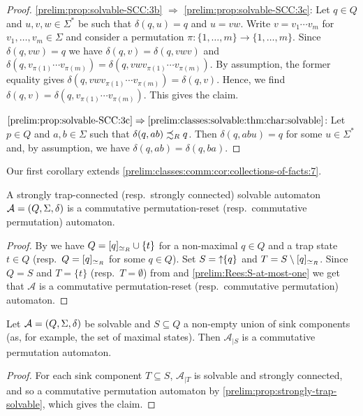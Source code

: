 \begin{proof}
\ref{prelim:prop:solvable-SCC:3b} $\Rightarrow$ \ref{prelim:prop:solvable-SCC:3c}: Let $q \in Q$ and $u,v,w \in \Sigma^*$
be such that $\delta(q, u) = q$ and $u = vw$. Write $v = v_1 \cdots v_m$
for $v_1, \ldots, v_m \in \Sigma$ and 
consider a permutation $\pi \colon \{1,\ldots, m\} \to \{1,\ldots,m\}$.
Since $\delta(q, vw) = q$ we have $ \delta(q, v) = \delta(q, vwv)$
and $\delta(q, v_{\pi(1)} \cdots v_{\pi(m)})
= \delta(q, vwv_{\pi(1)} \cdots v_{\pi(m)})$.	
By assumption, the former equality gives
$\delta(q, vwv_{\pi(1)} \cdots v_{\pi(m)}) = \delta(q, v)$.
Hence, we find 
$\delta(q, v) = \delta(q, v_{\pi(1)}\cdots v_{\pi(m)})$.
This gives the claim.

$\ref{prelim:prop:solvable-SCC:3c} \Rightarrow \ref{prelim:classes:solvable:thm:char:solvable}$:
 Let $p \in Q$ and $a,b \in \Sigma$
 such that $\delta(q, ab) \precsim_R q$.
 Then $\delta(q, abu) = q$ for some $u \in \Sigma^*$
 and, by assumption,
 we have $\delta(q, ab) = \delta(q, ba)$.
\end{proof}

Our first corollary extends \cref{prelim:classes:comm:cor:collections-of-facts:7}.

\begin{corollary} \label{prelim:prop:strongly-trap-solvable}
	A strongly trap-connected (resp.~strongly connected) solvable
	automaton $\mathcal A = (Q, \Sigma, \delta)$ 
	is a commutative permutation-reset (resp.~commutative permutation) automaton.
\end{corollary}
\begin{proof}
	By 
	we have $Q = [q]_{\simeq_R} \cup \{t\}$ for a non-maximal $q \in Q$ and a trap state $t \in Q$ 
	(resp.~$Q = [q]_{\simeq_R}$ for some $q \in Q$).
	Set $S = \mbox{\ensuremath{\displaystyle \uparrow \!\!\{q\}}}$ and $T = S \setminus [q]_{\simeq_R}$.
	Since $Q = S$ and $T = \{t\}$ (resp.~$T = \emptyset$)
	from 
	and \cref{prelim:Rees:S-at-most-one}
	we get
	that $\mathcal A$ is a commutative permutation-reset (resp.~commutative permutation)
	automaton.
\end{proof}

\begin{corollary} \label{cor:solvable-perm-SCC}
	Let $\mathcal A = (Q, \Sigma, \delta)$ be solvable
	and  $S \subseteq Q$ a non-empty union of sink components (as, for example, the set of maximal states).
	Then $\mathcal A_{|S}$ is a commutative permutation automaton.
\end{corollary}
\begin{proof}
	For each sink component $T \subseteq S$, $\mathcal A_{|T}$
	is solvable and strongly connected,
	and so a commutative permutation automaton
	by \cref{prelim:prop:strongly-trap-solvable}, which gives the claim. 
\end{proof}


